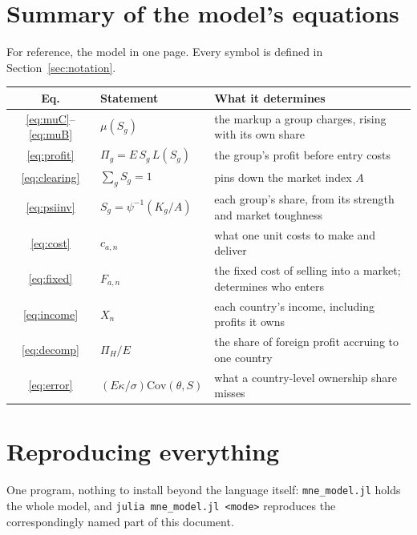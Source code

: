 \documentclass[11pt]{article}
\theoremstyle{plain}
\theoremstyle{remark}
\theoremstyle{definition}
\begin{document}

\section{Summary of the model's equations}

For reference, the model in one page. Every symbol is defined in
Section~\ref{sec:notation}.

\begin{center}
\begin{tabular}{clp{7.2cm}}
\toprule
Eq. & Statement & What it determines\\
\midrule
\eqref{eq:muC}--\eqref{eq:muB} & $\mu(S_g)$ & the markup a group charges, rising with its own share\\
\eqref{eq:profit} & $\Pi_g=E\,S_g\,L(S_g)$ & the group's profit before entry costs\\
\eqref{eq:clearing} & $\sum_g S_g=1$ & pins down the market index $A$\\
\eqref{eq:psiinv} & $S_g=\psi^{-1}(K_g/A)$ & each group's share, from its strength and market toughness\\
\eqref{eq:cost} & $c_{a,n}$ & what one unit costs to make and deliver\\
\eqref{eq:fixed} & $F_{a,n}$ & the fixed cost of selling into a market; determines who enters\\
\eqref{eq:income} & $X_n$ & each country's income, including profits it owns\\
\eqref{eq:decomp} & $\Pi_H/E$ & the share of foreign profit accruing to one country\\
\eqref{eq:error} & $(E\kappa/\sigma)\mathrm{Cov}(\theta,S)$ & what a country-level ownership share misses\\
\bottomrule
\end{tabular}
\end{center}

\section{Reproducing everything}

One program, nothing to install beyond the language itself: \texttt{mne\_model.jl}
holds the whole model, and \texttt{julia mne\_model.jl <mode>} reproduces the
correspondingly named part of this document.
\end{document}
